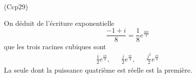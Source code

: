 \begin{tiny}(Ccp29)\end{tiny} On déduit de l'écriture exponentielle
\begin{displaymath}
 \frac{-1+i}{8}=\frac{1}{8}e^{\frac{3i\pi}{4}}
\end{displaymath}
que les trois racines cubiques sont
\begin{align*}
 \frac{1}{2}e^{\frac{i\pi}{4}},& & \frac{j}{2}e^{\frac{i\pi}{4}},& &\frac{j^2}{2}e^{\frac{i\pi}{4}}  
\end{align*}
La seule dont la puissance quatrième est réelle est la première.